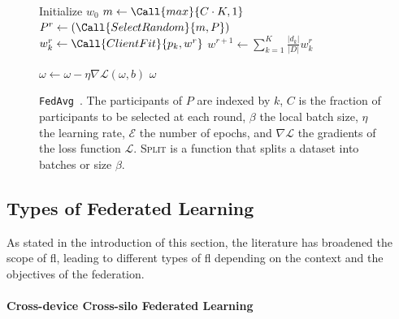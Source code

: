 \begin{figure}
  \centering
  \begin{minipage}{.8\textwidth}
    
    \begin{algorithm}[H]
      \caption{
        \texttt{FedAvg}~\cite{mcmahan_Communicationefficientlearningdeep_2017}.
        The participants of $P$ are indexed by $k$, $C$ is the fraction of participants to be selected at each round, $\beta$ the local batch size, $\eta$ the learning rate, $\mathcal{E}$ the number of epochs, and $\nabla\mathcal{L}$ the gradients of the loss function $\mathcal{L}$. \textsc{Split} is a function that splits a dataset into batches or size $\beta$.
        \label{alg:fedavg}
      }
      \begin{algorithmic}[1]
      
        \State Initialize $w_0$
          \State $ m \gets \Call{max}{C \cdot K, 1} $
          \State $ P^r \gets (\Call{SelectRandom}{m, P}) $
            \State $ w_k^r \gets \Call{ClientFit}{p_k, w^r} $
          \EndFor
          \State $ w^{r+1} \gets \sum_{k=1}^{K} \frac{|d_k|}{|D|} w_k^r $
        \EndFor
    
        \Statex
              \State $ \omega \gets \omega - \eta \nabla \mathcal{L}(\omega,b) $
            \EndFor
          \EndFor
          \Statex
          \State \Return $\omega$
        \EndFunction
      \end{algorithmic}
    \end{algorithm}
  \end{minipage}
\end{figure}


\subsection{Types of Federated Learning\label{sec:bg.fl.types}}

As stated in the introduction of this section, the literature has broadened the scope of \gls{fl}, leading to different types of \gls{fl} depending on the context and the objectives of the federation.

\paragraph{Cross-device \vs Cross-silo Federated Learning}

